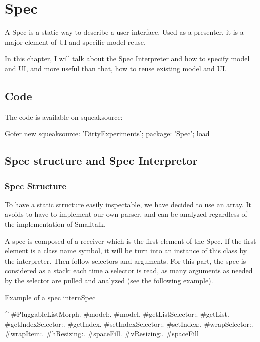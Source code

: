 \documentclass[a4paper,10pt,twoside]{book}
\begin{document}
\fi
\sloppy

\chapter{Spec}

A Spec is a static way to describe a user interface. Used as a presenter, it is a major element of UI and specific model reuse.

In this chapter, I will talk about the Spec Interpreter and how to specify model and UI, and more useful than that, how to reuse existing model and UI.

\section{Code}

The code is available on squeaksource:
\begin{code}{}
Gofer new
	squeaksource: 'DirtyExperiments';
	package: 'Spec';
	load
\end{code}

\section{Spec structure and Spec Interpretor}

\subsection{Spec Structure}

To have a static structure easily inspectable, we have decided to use an array. It avoids to have to implement our own parser, and can be analyzed regardless of the implementation of Smalltalk.

A spec is composed of a receiver which is the first element of the Spec. If the first element is a class name symbol, it will be turn into an instance of this class by the interpreter. Then follow selectors and arguments. For this part, the spec is considered as a stack: each time a selector is read, as many arguments as needed by the selector are pulled and analyzed (see the following example).

\begin{method}{Example of a spec}
internSpec

	^ {#PluggableListMorph.
	    	#model:.			  	  #model.
			#getListSelector:.	  #getList.
			#getIndexSelector:.	#getIndex.
			#setIndexSelector:.	#setIndex:.
			#wrapSelector:.	  	 #wrapItem:.
			#hResizing:.			#spaceFill.
			#vResizing:.			#spaceFill		}
\end{method} 
\end{document}
